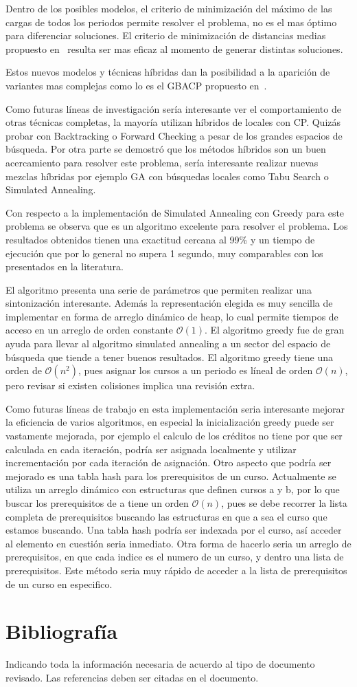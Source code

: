 \documentclass[letterpaper,10pt]{article}
\begin{document}
Dentro de los posibles modelos, el criterio de minimización del máximo de las cargas de todos los periodos permite resolver el problema, no es el mas óptimo para diferenciar soluciones. El criterio de minimización de distancias medias propuesto en~\cite{Monette07acp} resulta ser mas eficaz al momento de generar distintas soluciones.

Estos nuevos modelos y técnicas híbridas dan la posibilidad a la aparición de variantes mas complejas como lo es el GBACP propuesto en~\cite{GbacpGaspero,balac}.

Como futuras líneas de investigación sería interesante ver el comportamiento de otras técnicas completas, la mayoría utilizan híbridos de locales con CP. Quizás probar con Backtracking  o Forward Checking a pesar de los grandes espacios de búsqueda. Por otra parte se demostró que los métodos híbridos son un buen acercamiento para resolver este problema, sería interesante realizar nuevas mezclas híbridas por ejemplo GA con búsquedas locales como Tabu Search o Simulated Annealing.

Con respecto a la implementación de Simulated Annealing con Greedy para este problema se observa que es un algoritmo excelente para resolver el problema. Los resultados obtenidos tienen una exactitud cercana al 99\% y un tiempo de ejecución que por lo general no supera 1 segundo, muy comparables con los presentados en la literatura.

El algoritmo presenta una serie de parámetros que permiten realizar una sintonización interesante. Además la representación elegida es muy sencilla de implementar en forma de arreglo dinámico de heap, lo cual permite tiempos de acceso en un arreglo de orden constante $\mathcal{O}(1)$. El algoritmo greedy fue de gran ayuda para llevar al algoritmo simulated annealing a un sector del espacio de búsqueda que tiende a tener buenos resultados. El algoritmo greedy tiene una orden de $\mathcal{O}(n^2)$, pues asignar los cursos a un periodo es líneal de orden $\mathcal{O}(n)$, pero revisar si existen colisiones implica una revisión extra.

Como futuras líneas de trabajo en esta implementación seria interesante mejorar la eficiencia de varios algoritmos, en especial la inicialización greedy puede ser vastamente mejorada, por ejemplo el calculo de los créditos no tiene por que ser calculada en cada iteración, podría ser asignada localmente y utilizar incrementación por cada iteración de asignación. Otro aspecto que podría ser mejorado es una tabla hash para los prerequisitos de un curso. Actualmente se utiliza un arreglo dinámico con estructuras que definen cursos a y b, por lo que buscar los prerequisitos de a tiene un orden $\mathcal{O}(n)$, pues se debe recorrer la lista completa de prerequisitos buscando las estructuras en que a sea el curso que estamos buscando. Una tabla hash podría ser indexada por el curso, así acceder al elemento en cuestión seria inmediato. Otra forma de hacerlo seria un arreglo de prerequisitos, en que cada indice es el numero de un curso, y dentro una lista de prerequisitos. Este método seria muy rápido de acceder a la lista de prerequisitos de un curso en especifico.

\section{Bibliografía}

Indicando toda la información necesaria de acuerdo al tipo de documento
revisado. Las referencias deben ser citadas en el documento.  

\end{document}
